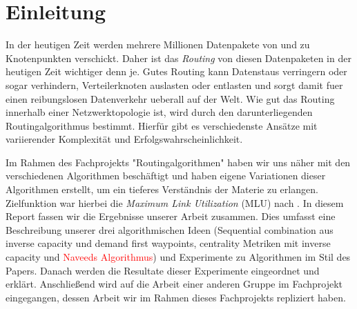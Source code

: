 \documentclass[sigconf, nonacm, review]{acmart}
\begin{document}


\received[\"uberarbeitet]{\textcolor{red}{ausstehend}}

\maketitle

\section{Einleitung}
In der heutigen Zeit werden mehrere Millionen Datenpakete von und zu Knotenpunkten verschickt.
Daher ist das \emph{Routing} von diesen Datenpaketen in der heutigen Zeit wichtiger denn je.
Gutes Routing kann Datenstaus verringern oder sogar verhindern, Verteilerknoten auslasten oder entlasten 
und sorgt damit fuer einen reibungslosen Datenverkehr ueberall auf der Welt.
Wie gut das Routing innerhalb einer Netzwerktopologie ist, 
wird durch den darunterliegenden Routingalgorithmus bestimmt.
Hierf\"ur gibt es verschiedenste Ans\"atze mit variierender Komplexit\"at und Erfolgswahrscheinlichkeit.

Im Rahmen des Fachprojekts "Routingalgorithmen" haben wir uns n\"aher mit den verschiedenen Algorithmen besch\"aftigt 
und haben eigene Variationen dieser Algorithmen erstellt,
um ein tieferes Verst\"andnis der Materie zu erlangen.
Zielfunktion war hierbei die \emph{Maximum Link Utilization} (MLU) nach \cite{foerster2021}.
In diesem Report fassen wir die Ergebnisse unserer Arbeit zusammen.
Dies umfasst eine Beschreibung unserer drei algorithmischen Ideen (Sequential combination aus inverse capacity und demand
first waypoints, centrality Metriken mit inverse capacity und \textcolor{red}{Naveeds Algorithmus})
und Experimente zu Algorithmen im Stil des Papers\cite{foerster2021}.
Danach werden die Resultate dieser Experimente eingeordnet und erkl\"art.
Anschließend wird auf die Arbeit einer anderen Gruppe im Fachprojekt eingegangen, dessen Arbeit wir im Rahmen dieses Fachprojekts repliziert haben.


\end{document}
